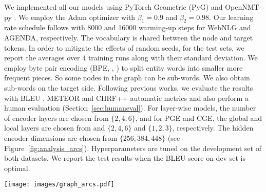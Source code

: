 \documentclass[11pt,a4paper]{article}
\begin{document}
We implemented all our models using PyTorch Geometric (PyG) \cite{Fey/Lenssen/2019} and \mbox{OpenNMT-py} \cite{opennmt}. We employ the Adam optimizer with $\beta_1=0.9$ and $\beta_2=0.98$. Our learning rate schedule follows \citet{NIPS2017_7181} with 8000 and 16000 warming-up steps for WebNLG and AGENDA, respectively. The vocabulary is shared between the node and target tokens. In order to mitigate the effects of random seeds, for the test sets, we report the averages over 4 training runs along with their standard deviation. We employ byte pair encoding (BPE, \citeauthor{sennrich-etal-2016-neural}, \citeyear{sennrich-etal-2016-neural}) to split entity words into smaller more frequent pieces. So some nodes in the graph can be sub-words. We also obtain sub-words on the target side. Following previous works, we evaluate the results with BLEU \cite{Papineni:2002:BMA:1073083.1073135}, METEOR \cite{Denkowski14meteoruniversal} and CHRF++ \cite{popovic-2015-chrf} automatic metrics and also perform a human evaluation (Section~\ref{sec:humaneval}). For layer-wise models, the number of encoder layers are chosen from $\{2, 4, 6\}$, and for {\selectfont PGE} and {\selectfont CGE}, the global and local layers are chosen from and $\{2, 4, 6\}$ and $\{1, 2, 3\}$, respectively. The hidden encoder dimensions are chosen from $\{256, 384, 448\}$ (see Figure~\ref{fig:analysis_arcs}). Hyperparameters are tuned on the development set of both datasets. We report the test results when the BLEU score on dev set is optimal.


















 \begin{figure*}[t]
    \centering
    \texttt{[image: images/graph\_arcs.pdf]}
    \vspace{-7mm}
    \caption{BLEU scores for AGENDA dev set, with respect to (a) the encoder layers, (b) the encoder hidden dimensions and (c) the number of parameters.}
    \label{fig:analysis_arcs}
\end{figure*}
\end{document}
